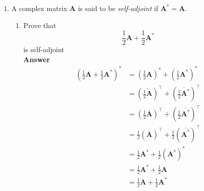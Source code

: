 \documentclass[11pt]{article}
\newcommand{\cj}{\overline}
\newcommand{\tb}{\textbf}
\theoremstyle{definition}
\begin{document}
\begin{enumerate}
\begin{align*}
            & = \begin{bmatrix} 0 \\ 3 \\ 1 \end{bmatrix} - \begin{bmatrix} \frac{4}{3} \\ \frac{4}{3} \\ \frac{4}{3} \end{bmatrix} +\begin{bmatrix} \frac{1}{2} \\ 0 \\ -\frac{1}{2} \end{bmatrix}\\ 
            & = \begin{bmatrix} -\frac{5}{6} \\ \frac{5}{3} \\ -\frac{5}{6} \end{bmatrix}
        \end{align*}

		
	\item A complex matrix $\tb{A}$ is said to be \emph{self-adjoint} if $\tb{A}^\ast = \tb{A}$. 
	\begin{enumerate}
		\item Prove that 
		\begin{equation*}
			\frac{1}{2} \tb{A} + \frac{1}{2} \tb{A}^\ast
		\end{equation*}
		is self-adjoint
            \\
            \textbf{Answer}
            \\
            \begin{align*}
			(\frac{1}{2} \tb{A} + \frac{1}{2} \tb{A}^\ast)^\ast 
                & = (\frac{1}{2} \tb{A})^\ast + (\frac{1}{2} \tb{A}^\ast)^\ast \\
                & = (\cj{\frac{1}{2} \tb{A}})^\top + (\cj{\frac{1}{2} \tb{A}^\ast})^\top \\
                & = (\frac{1}{2} \cj{\tb{A}})^\top + (\frac{1}{2}\cj{ \tb{A}^\ast})^\top \\
                & = \frac{1}{2} (\cj{\tb{A}})^\top + \frac{1}{2}(\cj{ \tb{A}^\ast})^\top \\
                & = \frac{1}{2}\tb{A}^\ast + \frac{1}{2} (\tb{A}^\ast)^\ast \\
                & = \frac{1}{2}\tb{A}^\ast + \frac{1}{2} \tb{A} \\
                & = \frac{1}{2} \tb{A} + \frac{1}{2}\tb{A}^\ast
		\end{align*}
		

\end{enumerate}
\end{enumerate}
\end{document}
